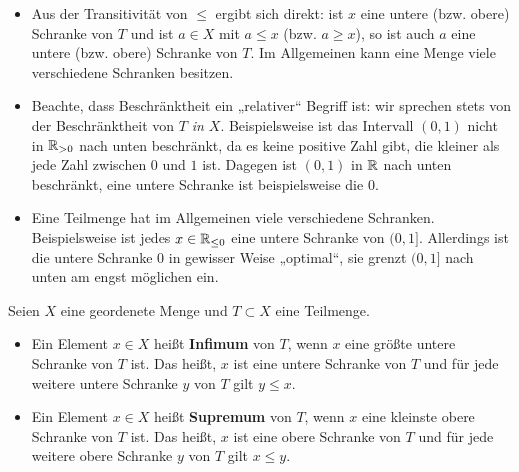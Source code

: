 \begin{bem} \quad
    \begin{itemize}
        \item Aus der Transitivität von $\le$ ergibt sich direkt: ist $x$ eine untere (bzw. obere) Schranke von $T$ und ist $a\in X$ mit $a\le x$ (bzw. $a\ge x$), so ist auch $a$ eine untere (bzw. obere) Schranke von $T$. Im Allgemeinen kann eine Menge viele verschiedene Schranken besitzen.
        \item Beachte, dass Beschränktheit ein „relativer“ Begriff ist: wir sprechen stets von der Beschränktheit von $T$ \emph{in $X$}. Beispielsweise ist das Intervall $(0,1)$ nicht in $\mathbb R_{>0}$ nach unten beschränkt, da es keine positive Zahl gibt, die kleiner als jede Zahl zwischen $0$ und $1$ ist. Dagegen ist $(0,1)$ in $\mathbb R$ nach unten beschränkt, eine untere Schranke ist beispielsweise die $0$.
        \item Eine Teilmenge hat im Allgemeinen viele verschiedene Schranken. Beispielsweise ist jedes $x\in \mathbb R_{\le 0}$ eine untere Schranke von $(0,1]$. Allerdings ist die untere Schranke $0$ in gewisser Weise „optimal“, sie grenzt $(0,1]$ nach unten am engst möglichen ein.
    \end{itemize}
\end{bem}


\begin{de}  
    Seien $X$ eine geordenete Menge und $T\subset X$ eine Teilmenge.
    \begin{itemize}
        \item Ein Element $x\in X$ heißt \textbf{Infimum} von $T$, wenn $x$ eine größte untere Schranke von $T$ ist. Das heißt, $x$ ist eine untere Schranke von $T$ und für jede weitere untere Schranke $y$ von $T$ gilt $y\le x$.
        \item Ein Element $x\in X$ heißt \textbf{Supremum} von $T$, wenn $x$ eine kleinste obere Schranke von $T$ ist. Das heißt, $x$ ist eine obere Schranke von $T$ und für jede weitere obere Schranke $y$ von $T$ gilt $x\le y$.
    \end{itemize}
\end{de}


